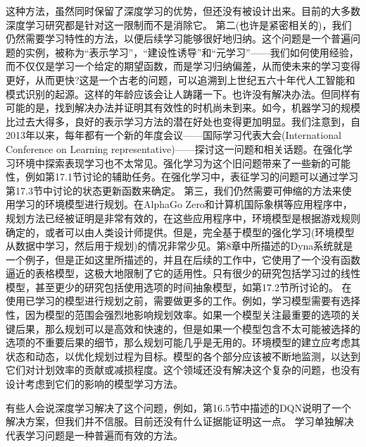这种方法，虽然同时保留了深度学习的优势，但还没有被设计出来。目前的大多数深度学习研究都是针对这一限制而不是消除它。
第二(也许是紧密相关的)，我们仍然需要学习特性的方法，以便后续学习能够很好地归纳。这个问题是一个普遍问题的实例，被称为“表示学习”，“建设性诱导”和“元学习”——我们如何使用经验，而不仅仅是学习一个给定的期望函数，而是学习归纳偏差，从而使未来的学习变得更好，从而更快?这是一个古老的问题，可以追溯到上世纪五六十年代人工智能和模式识别的起源。这样的年龄应该会让人踌躇一下。也许没有解决办法。但同样有可能的是，找到解决办法并证明其有效性的时机尚未到来。如今，机器学习的规模比过去大得多，良好的表示学习方法的潜在好处也变得更加明显。我们注意到，自2013年以来，每年都有一个新的年度会议——国际学习代表大会(International Conference on Learning representative)——探讨这一问题和相关话题。在强化学习环境中探索表现学习也不太常见。强化学习为这个旧问题带来了一些新的可能性，例如第17.1节讨论的辅助任务。在强化学习中，表征学习的问题可以通过学习第17.3节中讨论的状态更新函数来确定。
第三，我们仍然需要可伸缩的方法来使用学习的环境模型进行规划。在AlphaGo Zero和计算机国际象棋等应用程序中，规划方法已经被证明是非常有效的，在这些应用程序中，环境模型是根据游戏规则确定的，或者可以由人类设计师提供。但是，完全基于模型的强化学习(环境模型从数据中学习，然后用于规划)的情况非常少见。第8章中所描述的Dyna系统就是一个例子，但是正如这里所描述的，并且在后续的工作中，它使用了一个没有函数逼近的表格模型，这极大地限制了它的适用性。只有很少的研究包括学习过的线性模型，甚至更少的研究包括使用选项的时间抽象模型，如第17.2节所讨论的。
在使用已学习的模型进行规划之前，需要做更多的工作。例如，学习模型需要有选择性，因为模型的范围会强烈地影响规划效率。如果一个模型关注最重要的选项的关键后果，那么规划可以是高效和快速的，但是如果一个模型包含不太可能被选择的选项的不重要后果的细节，那么规划可能几乎是无用的。环境模型的建立应考虑其状态和动态，以优化规划过程为目标。模型的各个部分应该被不断地监测，以达到它们对计划效率的贡献或减损程度。这个领域还没有解决这个复杂的问题，也没有设计考虑到它们的影响的模型学习方法。

有些人会说深度学习解决了这个问题，例如，第16.5节中描述的DQN说明了一个解决方案，但我们并不信服。目前还没有什么证据能证明这一点。
学习单独解决代表学习问题是一种普遍而有效的方法。

